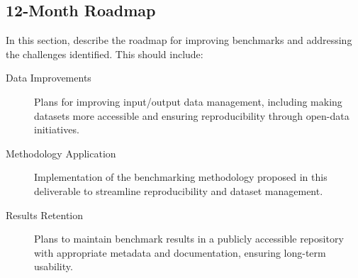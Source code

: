 
\subsection{12-Month Roadmap}
\label{sec:WP5:Feelpp:roadmap}

In this section, describe the roadmap for improving benchmarks and addressing the challenges identified. This should include:
\begin{description}
    \item[Data Improvements] Plans for improving input/output data management, including making datasets more accessible and ensuring reproducibility through open-data initiatives.
    \item[Methodology Application] Implementation of the benchmarking methodology proposed in this deliverable to streamline reproducibility and dataset management.
    \item[Results Retention] Plans to maintain benchmark results in a publicly accessible repository with appropriate metadata and documentation, ensuring long-term usability.
\end{description}

